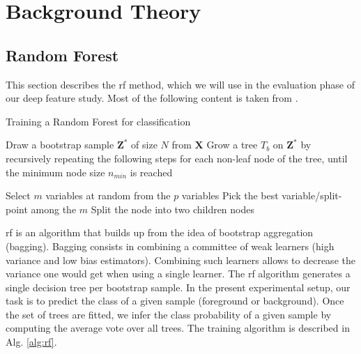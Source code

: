 \section{Background Theory}

\subsection{Random Forest}
\label{sec:rf}
This section describes the \gls{rf} method, which we will use in the evaluation phase of our deep feature study.
Most of the following content is taken from \cite{hastie09}.

\begin{algorithm}[H]
  \label{alg:rf}
 \caption{Training a Random Forest for classification}
 \begin{algorithmic}[1]
        \State Draw a bootstrap sample $\bm{Z}^{*}$ of size $N$ from $\bm{X}$
        \State Grow a tree $T_{b}$ on $\bm{Z}^{*}$ by recursively repeating the following steps for each non-leaf node of the tree, until the minimum node size $n_{min}$ is reached
        \begin{algsubstates}
                \State Select $m$ variables at random from the $p$ variables
                \State Pick the best variable/split-point among the $m$
                \State Split the node into two children nodes
            \end{algsubstates}
    \EndFor
  \end{algorithmic}
\end{algorithm}

\gls{rf} is an algorithm that builds up from the idea of bootstrap aggregation (bagging).
Bagging consists in combining a committee of weak learners (high variance and low bias estimators).
Combining such learners allows to decrease the variance one would get when using a single learner.
The \gls{rf} algorithm generates a single decision tree per bootstrap sample.
In the present experimental setup, our task is to predict the class of a given sample (foreground or background).
Once the set of trees are fitted, we infer the class probability of a given sample by computing the average vote over all trees.
The training algorithm is described in Alg. \ref{alg:rf}.




